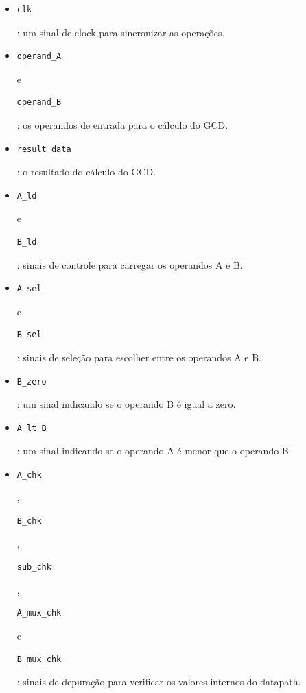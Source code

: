 \documentclass[a4paper,11pt]{article} %
\begin{document}
\begin{itemize}
    \item \begin{verbatim}clk\end{verbatim}: um sinal de clock para sincronizar as operações.
    \item \begin{verbatim}operand_A\end{verbatim} e \begin{verbatim}operand_B\end{verbatim}: os operandos de entrada para o cálculo do GCD.
    \item \begin{verbatim}result_data\end{verbatim}: o resultado do cálculo do GCD.
    \item \begin{verbatim}A_ld\end{verbatim} e \begin{verbatim}B_ld\end{verbatim}: sinais de controle para carregar os operandos A e B.
    \item \begin{verbatim}A_sel\end{verbatim} e \begin{verbatim}B_sel\end{verbatim}: sinais de seleção para escolher entre os operandos A e B.
    \item \begin{verbatim}B_zero\end{verbatim}: um sinal indicando se o operando B é igual a zero.
    \item \begin{verbatim}A_lt_B\end{verbatim}: um sinal indicando se o operando A é menor que o operando B.
    \item \begin{verbatim}A_chk\end{verbatim}, \begin{verbatim}B_chk\end{verbatim}, \begin{verbatim}sub_chk\end{verbatim}, \begin{verbatim}A_mux_chk\end{verbatim} e \begin{verbatim}B_mux_chk\end{verbatim}: sinais de depuração para verificar os valores internos do datapath.
\end{itemize}
\end{document}
